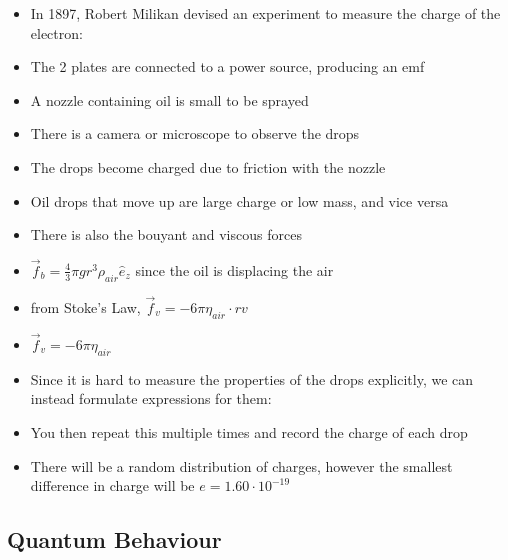 \documentclass{article}
\begin{document}
\begin{itemize}
    \item In 1897, Robert Milikan devised an experiment to measure the charge of the electron:
    \item The 2 plates are connected to a power source, producing an emf
    \item A nozzle containing oil is small to be sprayed
    \item There is a camera or microscope to observe the drops
    \item The drops become charged due to friction with the nozzle
    \item Oil drops that move up are large charge or low mass, and vice versa
    \item There is also the bouyant and viscous forces
    \item \(\vec f_b = \frac{4}{3}\pi g r^3\rho_{air}\hat e_z\) since the oil is displacing the air
    \item from Stoke's Law, \(\vec f_v = -6\pi\eta_{air}\cdot rv\)
    \item \(\vec f_v=-6\pi\eta_{air}\)
    \item Since it is hard to measure the properties of the drops explicitly, we can instead formulate expressions for them:
    \item You then repeat this multiple times and record the charge of each drop
    \item There will be a random distribution of charges, however the smallest difference in charge will be \(e = 1.60\cdot 10^{-19}\)
\end{itemize}

\subsection{Quantum Behaviour}
\end{document}

